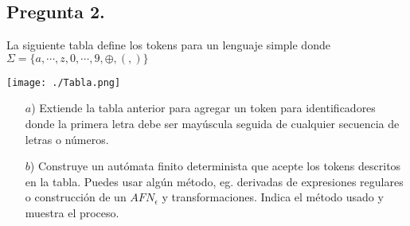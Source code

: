 \subsection*{Pregunta 2.} La siguiente tabla define los tokens para un lenguaje simple donde
$\Sigma = \{a, \dotsm, z, 0, \dotsm, 9, \oplus, (, )\}$
\begin{center}
  \texttt{[image: ./Tabla.png]}
\end{center}
\begin{itemize}
\item[$a$)] Extiende la tabla anterior para agregar un token para identificadores donde la
  primera letra debe ser mayúscula seguida de cualquier secuencia de letras o números.
\item[$b$)] Construye un autómata finito determinista que acepte los tokens descritos en la tabla.
  Puedes usar algún método, eg. derivadas de expresiones regulares o construcción de un $AFN_{\epsilon}$ y
  transformaciones. Indica el método usado y muestra el proceso.
\end{itemize}

